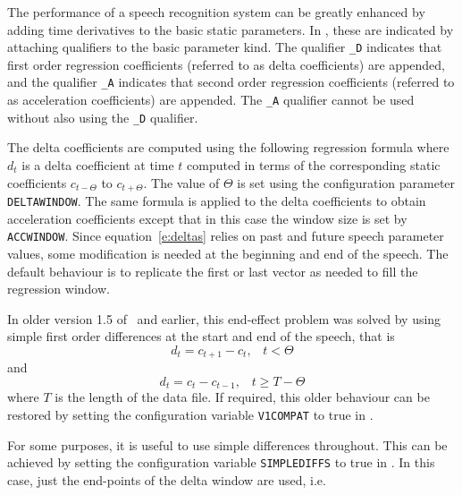 
The performance of a speech recognition system can be greatly enhanced by
adding time derivatives to the basic static parameters.  In \HTK, these are
indicated by attaching qualifiers to the basic parameter kind.  The qualifier
\texttt{\_D} indicates that first order regression coefficients (referred to as
delta coefficients) are appended, and the qualifier
\texttt{\_A} indicates that second order
regression coefficients (referred to as acceleration coefficients) are
appended. The \texttt{\_A} qualifier cannot be used without also using the
\texttt{\_D} qualifier.

The delta coefficients are computed using the
following regression formula
where $d_t$ is a delta coefficient at time $t$ computed in terms of the
corresponding static coefficients $c_{t-\Theta}$ to $c_{t+\Theta}$.  The value
of $\Theta$ is set using the configuration parameter
\texttt{DELTAWINDOW}.  The same formula
is applied to the delta coefficients to obtain acceleration coefficients except
that in this case the window size is set by
\texttt{ACCWINDOW}.  Since
equation~\ref{e:deltas} relies on past and future speech parameter values, 
some modification is needed at the beginning and end of the speech.  The
default behaviour is to replicate the first or last vector as needed to fill
the regression window.

In older version 1.5 of \HTK\ and earlier, this end-effect problem was solved
by using simple 
first order differences at the start and end of the speech, that is
\begin{equation}
   d_t = c_{t+1} - c_t,\;\;\; t<\Theta
\end{equation}
and
\begin{equation}
   d_t = c_t - c_{t-1}, \;\;\; t \geq T-\Theta
\end{equation}
where $T$ is the length of the data file.  If required, this older behaviour
can be restored by setting the configuration variable 
\texttt{V1COMPAT}
to true in .

For some purposes, it is useful to use simple differences throughout.  This
can be achieved by setting the configuration 
variable \texttt{SIMPLEDIFFS}
to true in .  In this case, just the end-points of the delta window
are used, i.e.

